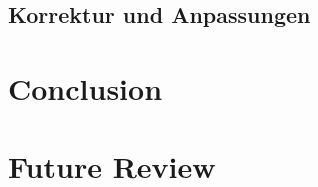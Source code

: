 \documentclass[a4paper,twoside,11pt, pagesize]{scrartcl}
\begin{document}
\subsection{Korrektur und Anpassungen}
\section{Conclusion}
\section{Future Review}
\newpage
\printbibliography%
\end{document}
